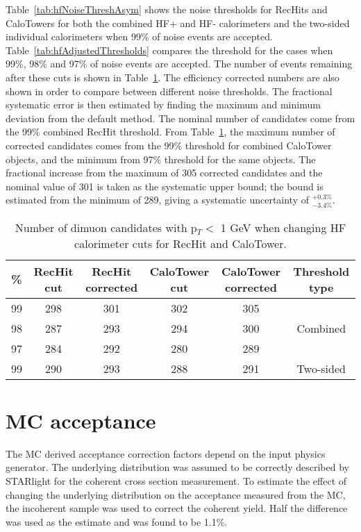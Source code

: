     Table~\ref{tab:hfNoiseThreshAsym} shows the noise thresholds for RecHits 
      and CaloTowers for both the combined HF+ and HF- calorimeters and the 
      two-sided individual calorimeters when 99\% of noise events are accepted.
    Table~\ref{tab:hfAdjustedThresholds} compares the threshold for the cases 
      when 99\%, 98\% and 97\% of noise events are accepted.
    The number of \JPsi{} events remaining after these cuts is shown in 
      Table~\ref{tab:hfAdjThreshYields}. 
    The efficiency corrected numbers are also shown in order to compare between
      different noise thresholds. 
    The fractional systematic error is then estimated by finding the maximum 
      and minimum deviation from the default method. 
    The nominal number of candidates come from the 99\% combined RecHit 
      threshold.
    From Table~\ref{tab:hfAdjThreshYields}, the maximum number of corrected 
      candidates comes from the 99\% threshold for combined CaloTower objects,
      and the minimum from 97\% threshold for the same objects. 
    The fractional increase from the maximum of 305 corrected candidates and 
      the nominal value of 301 is taken as the systematic upper bound; the 
      bound is estimated from the minimum of 289, giving a systematic 
      uncertainty of $^{+0.3\%}_{-3.4\%}$.
    \begin{table}[!Hhbt]
      \centering
        \begin{tabular}{|c|c|c|c|c|c|} \hline
          \% &  RecHit cut & RecHit corrected & CaloTower cut & CaloTower corrected & Threshold type \\ \hline
          99 & 298 & 301 & 302 & 305 & \multirow{3}{*}{Combined} \\ \hhline{-----~}
          98 & 287 & 293 & 294 & 300 & \\ \hhline{-----~}
          97 & 284 & 292 & 280 & 289 & \\ \hline \hline
          99 & 290 & 293 & 288 & 291 & Two-sided \\ \hline
        \end{tabular}
      \caption{Number of \DIFdelbeginFL {}\DIFdelendFL \DIFaddbeginFL {}\DIFaddendFL dimuon candidates with  p$_{T} <$ 1 GeV when changing HF calorimeter cuts for RecHit and CaloTower.}
      \label{tab:hfAdjThreshYields}
    \end{table}

  \section{MC acceptance}
    The MC derived acceptance correction factors depend on the input physics
      generator. 
    The underlying \pt{} distribution was assumed to be correctly 
      described by STARlight for the coherent cross section measurement.
    To estimate the effect of changing the underlying \pt{} distribution 
      on the acceptance measured from the MC, the incoherent sample was used 
      to correct the coherent yield.
    Half the difference was used as the estimate and was found to be 1.1\%.

